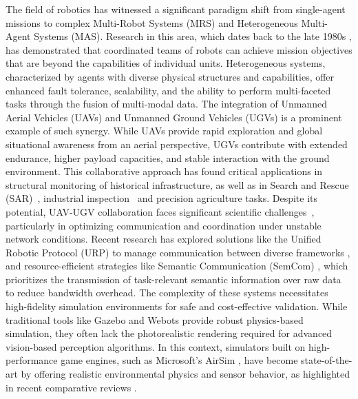 The field of robotics has witnessed a significant paradigm shift from single-agent missions to complex Multi-Robot Systems (MRS) and Heterogeneous Multi-Agent Systems (MAS). 
Research in this area, which dates back to the late 1980s \cite{cao1997cooperative}, has demonstrated that coordinated teams of robots can achieve mission objectives that are beyond the capabilities of individual units. 
Heterogeneous systems, characterized by agents with diverse physical structures and capabilities, offer enhanced fault tolerance, scalability, and the ability to perform multi-faceted tasks through the fusion of multi-modal data.\newline\newline
The integration of Unmanned Aerial Vehicles (UAVs) and Unmanned Ground Vehicles (UGVs) is a prominent example of such synergy. While UAVs provide rapid exploration and global situational awareness from an aerial perspective, UGVs contribute with extended endurance, higher payload capacities, and stable interaction with the ground environment. 
This collaborative approach has found critical applications in structural monitoring of historical infrastructure, as well as in Search and Rescue (SAR)~\cite{HUANG2024109491}, industrial inspection~\cite{s20216384} and precision agriculture tasks.\newline\newline
Despite its potential, UAV-UGV collaboration faces significant scientific challenges~\cite{munasinghe2024uavugv}, particularly in optimizing communication and coordination under unstable network conditions. Recent research has explored solutions like the Unified Robotic Protocol (URP) to manage communication between diverse frameworks \cite{shahar2025ugv_uav}, and resource-efficient strategies like Semantic Communication (SemCom) \cite{zhang2023semantic}, which prioritizes the transmission of task-relevant semantic information over raw data to reduce bandwidth overhead.\newline\newline
The complexity of these systems necessitates high-fidelity simulation environments for safe and cost-effective validation. While traditional tools like Gazebo and Webots provide robust physics-based simulation, they often lack the photorealistic rendering required for advanced vision-based perception algorithms. In this context, simulators built on high-performance game engines, such as Microsoft's AirSim \cite{airsim}, have become state-of-the-art by offering realistic environmental physics and sensor behavior, as highlighted in recent comparative reviews \cite{nikolaiev2024comparative}.\newline\newline
